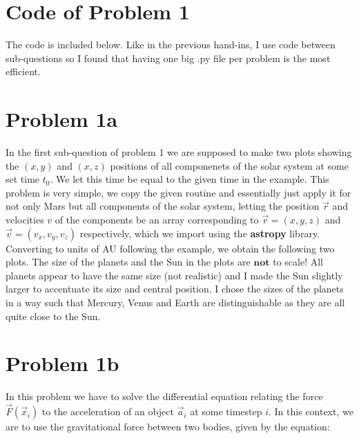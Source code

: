 \section*{Code of Problem 1}

The code is included below. Like in the previous hand-ins, I use code between sub-questions so I found that having one big .py file per problem is the most efficient.
%

\section*{Problem 1a}

In the first sub-question of problem 1 we are supposed to make two plots showing the $(x,y)$ and $(x,z)$ positions of all componenets of the solar system at some set time $t_0$. We let this time be equal to the given time in the example. This problem is very simple, we copy the given routine and essentially just apply it for not only Mars but all components of the solar system, letting the position $\vec{r}$ and velocities ${v}$ of the components be an array corresponding to $\vec{r} = (x,y,z)$ and $\vec{v} = (v_x,v_y,v_z)$ respectively, which we import using the \textbf{astropy} library. Converting to units of AU following the example, we obtain the following two plots. The size of the planets and the Sun in the plots are $\textbf{not}$ to scale! All planets appear to have the same size (not realistic) and I made the Sun slightly larger to accentuate its size and central position. I chose the sizes of the planets in a way such that Mercury, Venus and Earth are distinguishable as they are all quite close to the Sun. 



\section*{Problem 1b}

In this problem we have to solve the differential equation relating the force $\vec{F}(\vec{x}_i)$ to the acceleration of an object $\vec{a}_i$ at some timestep $i$. In this context, we are to use the gravitational force between two bodies, given by the equation:\\

